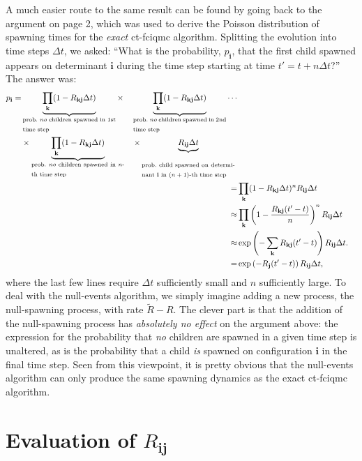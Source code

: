\documentclass[a4paper, 11pt]{article}
\newcommand{\bi}{\mathbf{i}}
\newcommand{\bj}{\mathbf{j}}
\newcommand{\bk}{\mathbf{k}}
\begin{document}
A much easier route to the same result can be found by going back to the
argument on page 2, which was used to derive the Poisson distribution of
spawning times for the \emph{exact} ct-fciqmc algorithm. Splitting the
evolution into time steps $\Delta t$, we asked: ``What is the
probability, $p_{\bi}$, that the first child spawned appears on
determinant $\bi$ during the time step starting at time $t' = t +
n\Delta t$?''  The answer was:
\begin{align*}
\begin{split}
p_\bi =& 
\underbrace{\prod_{\bk} (1-R_{\bk\bj}\Delta
  t)}_{\textrm{\parbox{4cm}{prob.\ \emph{no} children spawned in 1st
      time step}}} \times
\quad\underbrace{\prod_{\bk} (1-R_{\bk\bj}\Delta t)}_{\textrm{\parbox{4cm}{prob.\ \emph{no} children spawned in 2nd time step}}}
\cdots \\
& \times \underbrace{\prod_{\bk} (1-R_{\bk\bj}\Delta t)}_{\textrm{\parbox{4cm}{prob.\ \emph{no} children spawned in $n$-th time step}}} 
\quad \times \underbrace{R_{\bi\bj}\Delta t}_{\textrm{\parbox{4cm}{\rule{0mm}{5.5mm}prob.\ child spawned on determinant $\bi$ in $(n+1)$-th time step}}}
\end{split} \\
\hphantom{p}=& \prod_{\bk} (1-R_{\bk\bj}\Delta t)^n R_{\bi\bj}\Delta
t \\
\hphantom{p}\approx& \prod_{\bk}
\left(1-\frac{R_{\bk\bj}(t'-t)}{n}\right)^n 
R_{\bi\bj}\Delta t \\
\hphantom{p}\approx&  \exp\left(-\sum_\bk R_{\bk\bj}(t'-t)\right)
R_{\bi\bj}\Delta t. \\
\hphantom{p}=& \exp\left(- R_{\bj}(t'-t)\right)
R_{\bi\bj}\Delta t,
\end{align*}
where the last few lines require $\Delta t$ sufficiently small and $n$
sufficiently large. To deal with the null-events algorithm, we simply
imagine adding a new process, the null-spawning process, with rate
$\tilde{R} - R$. The clever part is that the addition of the
null-spawning process has \emph{absolutely no effect} on the argument
above: the expression for the probability that \emph{no} children are
spawned in a given time step is unaltered, as is the probability that a
child \emph{is} spawned on configuration $\bi$ in the final time
step. Seen from this viewpoint, it is pretty obvious that the
null-events algorithm can only produce the same spawning dynamics as the
exact ct-fciqmc algorithm.


\appendix
\section{Evaluation of $R_{\bi\bj}$}
\end{document}
